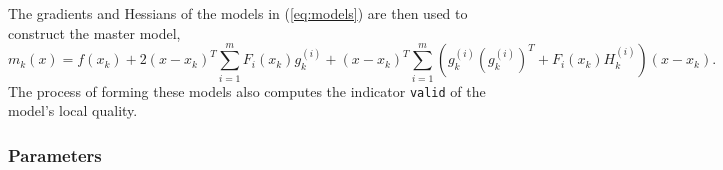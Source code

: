 The gradients and Hessians of the models in (\ref{eq:models}) are then
used to construct the master model, 
\begin{equation}
m_k(x) = f(x_k) + 
2(x-x_k)^T \sum_{i=1}^{m} F_i(x_k) g_k^{(i)} +
(x-x_k)^T \sum_{i=1}^{m}
\left( g_k^{(i)} \left(g_k^{(i)}\right)^T +  F_i(x_k)
H_k^{(i)}\right) (x-x_k).
 \label{eq:newton2}
\end{equation}
The process of forming these models also computes the indicator
\texttt{valid} of the model's local quality.


\subsubsection{Parameters}
\begin{comment}
If evaluations of the residual vector $F$ are available, then this can be
input and will often result in improved performance. Assuming that
\texttt{nfs}$>0$ such points are available, then the user should input the
matrix of locations \texttt{X0} $=[y_1, \ldots, y_{\rm nfs}]$ and the
corresponding matrix of residuals \texttt{F0} $= [F(y_1), \ldots, F(y_{\rm
nfs})]$. The user selects which one of these points is the starting point
(this is typically the point $\arg \min_{i=1,\ldots, {\rm nfs}}
\|F(y_i)\|^2$) to be used and inputs the index as the integer
\texttt{xkin}.

If no such points are available, then \texttt{nfs}$=0$, \texttt{F0} is
empty, \texttt{xkin}$=1$, and the user inputs the desired starting point
(whose residual has not yet been evaluated) as \texttt{X0} $=[x_0]$.


In addition to the inputs \texttt{nfs}, \texttt{X0}, \texttt{F0},
\texttt{xkin} above, 
\end{comment}

